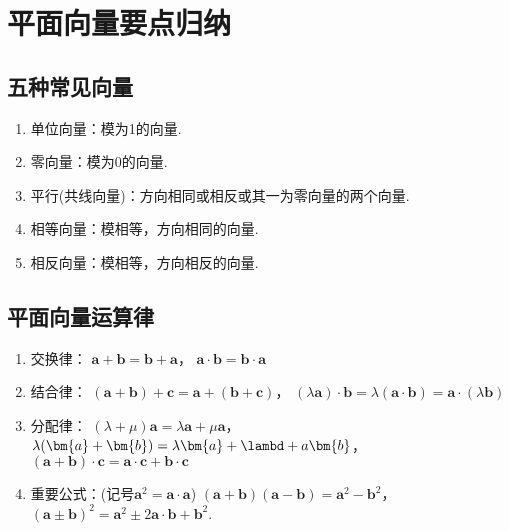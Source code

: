   \Teach{}
  \newtheorem*{Theorem}{定理}
  \makefront
\vspace{-1.5em}
\startexercise
\section{平面向量要点归纳}
  \subsection{五种常见向量}
    \begin{enumerate}[label=\arabic*)]
      \item 单位向量：模为1的向量.
      \item 零向量：模为0的向量.
      \item 平行(共线向量)：方向相同或相反或其一为零向量的两个向量.
      \item 相等向量：模相等，方向相同的向量.
      \item 相反向量：模相等，方向相反的向量.
    \end{enumerate}
  \subsection{平面向量运算律}
    \begin{enumerate}[label=\arabic*)]
      \item 交换律：
        $\bm a+\bm b=\bm b+\bm a$，\quad
        $\bm a\cdot\bm b=\bm b\cdot\bm a$
      \item 结合律：
        $(\bm{a}+\bm{b})+\bm{c}=\bm{a}+(\bm{b}+\bm{c})$，\quad
        $(\lambda \bm a)\cdot\bm{b}=\lambda(\bm a\cdot\bm b)=\bm{a}\cdot(\lambda\bm{b})$
      \item 分配律：
        $(\lambda+\mu)\bm{a}=\lambda\bm{a}+\mu\bm{a}$，\quad
        $\lambda(\bm{a}+\bm{b})=\lambda\bm{a}+\lambd+a\bm{b}$，\quad
        $(\bm a+\bm b)\cdot \bm c=\bm a\cdot\bm c+\bm b\cdot \bm c$
      \item 重要公式：(记号$\bm a^2=\bm a\cdot\bm a$)
        $(\bm a+\bm b)(\bm a-\bm b)=\bm a^2-\bm b^2$，\quad
        $(\bm a\pm\bm b)^2=\bm a^2\pm2\bm a\cdot\bm b+\bm b^2$.
    \end{enumerate}
